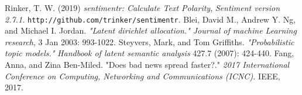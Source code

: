 \documentclass[reqno]{article}
\theoremstyle{definition}
\theoremstyle{definition}
\theoremstyle{remark}
\begin{document}
\newpage
\begin{thebibliography}{9}
 Rinker, T. W. (2019) \textit{sentimentr: Calculate Text Polarity}, \textit{Sentiment version 2.7.1.} \texttt{http://github.com/trinker/sentimentr}.
 Blei, David M., Andrew Y. Ng, and Michael I. Jordan. \textit{"Latent dirichlet allocation." Journal of machine Learning research}, 3 Jan 2003: 993-1022.
 Steyvers, Mark, and Tom Griffiths. \textit{"Probabilistic topic models."} \textit{Handbook of latent semantic analysis} 427.7 (2007): 424-440.
 Fang, Anna, and Zina Ben-Miled. "Does bad news spread faster?." \textit{2017 International Conference on Computing, Networking and Communications (ICNC).} IEEE, 2017.
\end{thebibliography}
\end{document}
